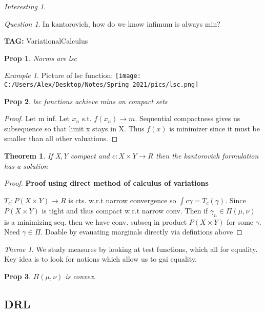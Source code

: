\documentclass[11pt]{article}
\newtheorem{theorem}{Theorem}
\newtheorem{prop}{Prop}
\theoremstyle{remark}
\newtheorem{quest}{Question}
\newtheorem{interest}{Interesting}
\newtheorem{theme}{Theme}
\newtheorem{example}{Example}
\begin{document}
\begin{interest}
\begin{quest}
	In kantorovich, how do we know infimum is always min?
\end{quest}

\textbf{TAG:} VariationalCalculus

\begin{prop}
	Norms are lsc
\end{prop}

\begin{example}
	Picture of lsc function:
	\texttt{[image: C:/Users/Alex/Desktop/Notes/Spring 2021/pics/lsc.png]}
\end{example}

\begin{prop}
	lsc functions achieve mins on compact sets
\end{prop}

\begin{proof}
	Let m inf. Let $x_n$ s.t. $f(x_n) \to m$. Sequential compactness gives us subsequence so that limit x stays in X. Thus $f(x)$ is minimizer since it must be smaller than all other valuations. 
\end{proof}

\begin{theorem}
	If X,Y compact and $c : X \times Y\to R$ then the kantorovich formulation has a solution
\end{theorem}

\begin{proof}
	\textbf{Proof using direct method of calculus of variations}

	$T_c : P(X\times Y) \to R$ is cts. w.r.t narrow convergence so $\int c \gamma = T_c(\gamma)$. Since $P(X \times Y)$ is tight and thus compact w.r.t narrow conv. Then if $\gamma_n \in \Pi(\mu,\nu)$ is a minimizing seq. then we have conv. subseq in product $P(X \times Y)$ for some $\gamma$. Need  $\gamma \in \Pi$. Doable by evauating marginals directly via  defintions above
\end{proof}

\begin{theme}
	We study measures by looking at test functions, which all for equality. Key idea is to look for notions which allow us to gai equality.
\end{theme}

\begin{prop}
	$\Pi(\mu,\nu)$ is convex.
\end{prop}

\subsection{DRL}


\end{interest}
\end{document}
